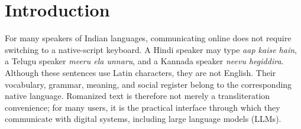 




\section{Introduction}

For many speakers of Indian languages, communicating online does not require
switching to a native-script keyboard. A Hindi speaker may type
\textit{aap kaise hain}, a Telugu speaker \textit{meeru ela unnaru}, and a
Kannada speaker \textit{neevu hegiddira}. Although these sentences use Latin
characters, they are not English. Their vocabulary, grammar, meaning, and
social register belong to the corresponding native language. Romanized text is
therefore not merely a transliteration convenience; for many users, it is the
practical interface through which they communicate with digital systems,
including large language models (LLMs).

